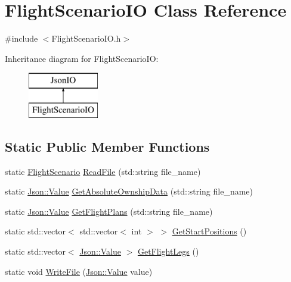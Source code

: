 \hypertarget{class_flight_scenario_i_o}{}\section{Flight\+Scenario\+I\+O Class Reference}
\label{class_flight_scenario_i_o}


{\ttfamily \#include $<$Flight\+Scenario\+I\+O.\+h$>$}

Inheritance diagram for Flight\+Scenario\+I\+O\+:\begin{figure}[H]
\begin{center}
\leavevmode
\includegraphics[height=2.000000cm]{class_flight_scenario_i_o}
\end{center}
\end{figure}
\subsection*{Static Public Member Functions}
\begin{DoxyCompactItemize}
\item 
static \hyperlink{class_flight_scenario}{Flight\+Scenario} \hyperlink{class_flight_scenario_i_o_a932ffd37a422cbb044ac1d97866bbc5e}{Read\+File} (std\+::string file\+\_\+name)
\item 
static \hyperlink{class_json_1_1_value}{Json\+::\+Value} \hyperlink{class_flight_scenario_i_o_a725bce8083bc2a390d6bd16860a99892}{Get\+Absolute\+Ownship\+Data} (std\+::string file\+\_\+name)
\item 
static \hyperlink{class_json_1_1_value}{Json\+::\+Value} \hyperlink{class_flight_scenario_i_o_aa5aa3abf7817e22efc7a57a8d422a6c7}{Get\+Flight\+Plans} (std\+::string file\+\_\+name)
\item 
static std\+::vector$<$ std\+::vector$<$ int $>$ $>$ \hyperlink{class_flight_scenario_i_o_a8b9ae191e8c7d182edf553096fbbf72b}{Get\+Start\+Positions} ()
\item 
static std\+::vector$<$ \hyperlink{class_json_1_1_value}{Json\+::\+Value} $>$ \hyperlink{class_flight_scenario_i_o_a65eb5824e5ec0d9790c93ee6abf2166d}{Get\+Flight\+Legs} ()
\item 
static void \hyperlink{class_flight_scenario_i_o_a7f561135d3cc2d7f867bf00acfc6bad1}{Write\+File} (\hyperlink{class_json_1_1_value}{Json\+::\+Value} value)
\end{DoxyCompactItemize}
